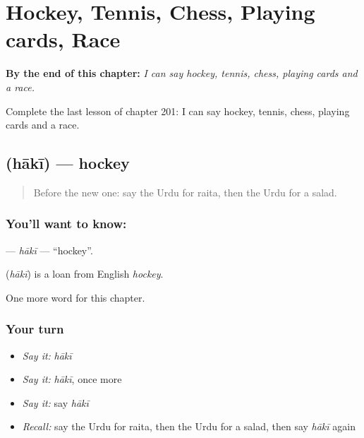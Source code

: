 
\chapter{Hockey, Tennis, Chess, Playing cards, Race}
\label{ch:ur-hockey-tennis-chess-playing-cards-race}

\begin{chapteropening}
\textbf{By the end of this chapter:} \emph{I can say hockey, tennis, chess, playing cards and a race.}

Complete the last lesson of chapter 201: I can say hockey, tennis, chess, playing cards and a race.
\end{chapteropening}

\section[\texorpdfstring{\ur{ہاکی} (hākī)}{ہاکی (hākī)}]{ (hākī) — hockey}

\label{lesson:UR-C201-haki}



\begin{quote}
Before the new one: say the Urdu for raita, then the Urdu for a salad.
\end{quote}

\subsection*{You'll want to know: }
\textbf{} — \emph{hākī} — \textquotedblleft{}hockey\textquotedblright{}.

\begin{cousinweb}
\textbf{} (\emph{hākī}) is a loan from English \emph{hockey}.
\end{cousinweb}

\begin{grammarlens}[title={What you've built}]
One more word for this chapter.
\end{grammarlens}

\subsection*{Your turn}
\begin{itemize}
\raggedright
  \item \emph{Say it:} \emph{hākī}
  \item \emph{Say it:} \emph{hākī}, once more
  \item \emph{Say it:} say \emph{hākī}
  \item \emph{Recall:} say the Urdu for raita, then the Urdu for a salad, then say \emph{hākī} again
\end{itemize}

